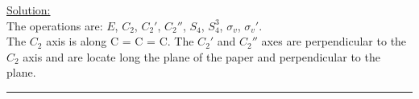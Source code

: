 \noindent
\underline{Solution:}\\

\noindent
The operations are: $E$, $C_2$, $C_2'$, $C_2''$, $S_4$, $S_4^3$, $\sigma_v$, $\sigma_v'$.\\
The $C_2$ axis is along C = C = C. The $C_2'$ and $C_2''$ axes are perpendicular to the $C_2$ axis
and are locate long the plane of the paper and perpendicular to the plane.\\

\hrule\vspace{0.5cm}




